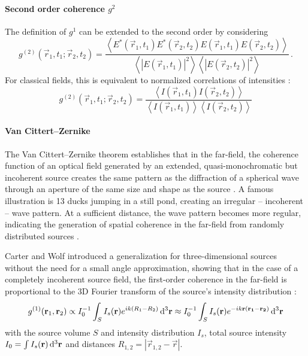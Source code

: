 \paragraph{Second order coherence $g^2$}
The definition of $g^1$ can be extended to the second order by considering
\begin{equation}
	g^{(2)}(\vec{r}_1,t_1;\vec{r}_2,t_2)= 
	\frac{\left< E^*(\vec{r}_1,t_1)E^*(\vec{r}_2,t_2)E(\vec{r}_1,t_1)E(\vec{r}_2,t_2) \right>}{\left<\left | E(\vec{r}_1,t_1)\right |^2 \right> \left< \left |E(\vec{r}_2,t_2)\right |^2 \right>} \,.	
\end{equation}
For classical fields, this is equivalent  to normalized correlations of intensities \cite{goodman2000}:
\begin{equation}
	g^{(2)}(\vec{r}_1,t_1;\vec{r}_2,t_2)= 
		\frac{\left< I(\vec{r}_1,t_1)I(\vec{r}_2,t_2) \right>}{\left<I(\vec{r}_1,t_1)\right>\left<I(\vec{r}_2,t_2)\right>}	
		\label{eq:g2}
\end{equation}


\paragraph{Van Cittert–Zernike}
The Van Cittert–Zernike theorem establishes that in the far-field, the coherence function of an optical field generated by an extended, quasi-monochromatic but incoherent source creates the same pattern as the diffraction of a spherical wave through an aperture of the same size and shape as the source \cite{born1980}. A famous illustration is 13 ducks jumping in a still pond, creating an irregular -- incoherent -- wave pattern. At a sufficient distance, the wave pattern becomes more regular, indicating the generation of spatial coherence in the far-field from randomly distributed sources \cite{ducks}.

Carter and Wolf introduced a generalization for three-dimensional sources without the need for a small angle approximation, showing that in the case of a completely incoherent source field, the first-order coherence in the far-field is proportional to the 3D Fourier transform of the source's intensity distribution \cite{rosen1996, goodman2005, carter1981}:
\begin{equation}
	g^{(1)}(\mathbf{r}_1,\mathbf{r}_2) \propto I_0^{-1} \int_{S} I_s(\mathbf{r}) e^{ik(R_1-R_2)} \operatorname{\mathrm{d}^3 \!} \mathbf{r} \approx I_0^{-1} \int_{S} I_s(\mathbf{r}) e^{-ik\mathbf{r}(\mathbf{r_1}-\mathbf{r_2})} \operatorname{\mathrm{d}^3 \!} \mathbf{r}
	\label{eq:vcz}
\end{equation}
with the source volume $S$ and intensity distribution $I_s$, total source intensity $I_0=\int I_s(\mathbf{r}) \operatorname{\mathrm{d}^3 \!} \mathbf{r}$ and distances $R_{1,2}=\left|\vec{r}_{1,2}-\vec{r}\right|$. 

